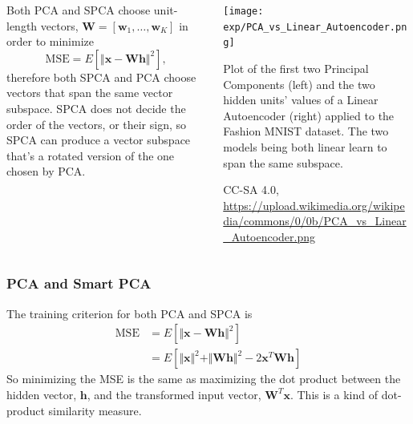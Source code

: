 \documentclass{beamer}
\begin{document}
\begin{frame}
  \begin{columns}
    \begin{column}{0.5\textwidth}
      Both PCA and SPCA choose unit-length vectors, $\bm{W}=[\bm{w}_1,\ldots,\bm{w}_K]$ in
      order to minimize
      \begin{displaymath}
        \mbox{MSE}=E\left[\Vert\bm{x}-\bm{W}\bm{h}\Vert^2\right],
      \end{displaymath}
      therefore both SPCA and PCA choose vectors that span the same
      vector subspace.  SPCA does not decide the order of the vectors,
      or their sign, so SPCA can produce a vector subspace that's a
      rotated version of the one chosen by PCA.
    \end{column}
    \begin{column}{0.5\textwidth}
      \begin{center}
        \texttt{[image: exp/PCA\_vs\_Linear\_Autoencoder.png]}

        Plot of the first two Principal Components (left) and the two
        hidden units' values of a Linear Autoencoder (right) applied
        to the Fashion MNIST dataset. The two models being both linear
        learn to span the same subspace.
        
        \begin{tiny}
          CC-SA 4.0,
          \url{https://upload.wikimedia.org/wikipedia/commons/0/0b/PCA_vs_Linear_Autoencoder.png}
        \end{tiny}
      \end{center}
    \end{column}
  \end{columns}
\end{frame}

\begin{frame}
  \frametitle{PCA and Smart PCA}

  The training criterion for both PCA and SPCA is
  \begin{align*}
    \mbox{MSE} &=E\left[\Vert\bm{x}-\bm{W}\bm{h}\Vert^2\right]\\
    &=E\left[\Vert\bm{x}\Vert^2+\Vert\bm{W}\bm{h}\Vert^2-2\bm{x}^T\bm{W}\bm{h}\right]
  \end{align*}
  So minimizing the MSE is the same as maximizing the dot product between
  the hidden vector, $\bm{h}$, and the transformed input vector, $\bm{W}^T\bm{x}$.
  This is a kind of dot-product similarity measure.
\end{frame}
\end{document}
